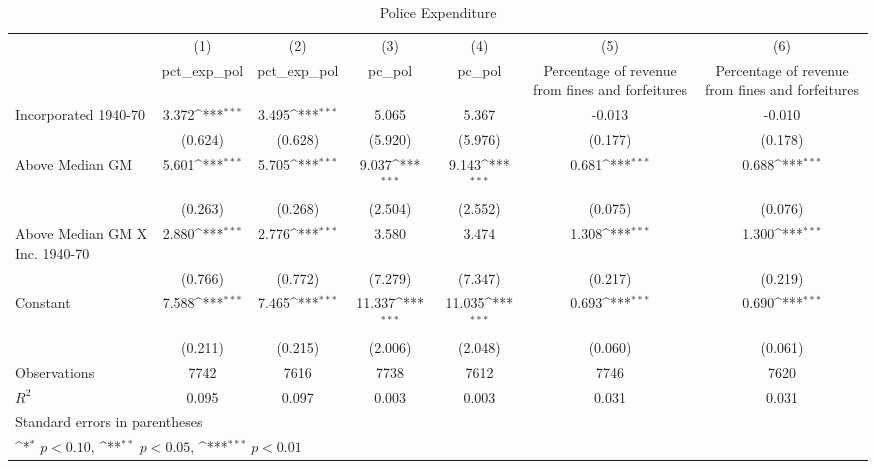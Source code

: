 \begin{table}[htbp]\centering
\def\sym#1{\ifmmode^{#1}\else\(^{#1}\)\fi}
\caption{Police Expenditure}
\begin{tabular}{l*{6}{c}}
\hline\hline
                    &\multicolumn{1}{c}{(1)}&\multicolumn{1}{c}{(2)}&\multicolumn{1}{c}{(3)}&\multicolumn{1}{c}{(4)}&\multicolumn{1}{c}{(5)}&\multicolumn{1}{c}{(6)}\\
                    &\multicolumn{1}{c}{pct\_exp\_pol}&\multicolumn{1}{c}{pct\_exp\_pol}&\multicolumn{1}{c}{pc\_pol}&\multicolumn{1}{c}{pc\_pol}&\multicolumn{1}{c}{Percentage of revenue from fines and forfeitures}&\multicolumn{1}{c}{Percentage of revenue from fines and forfeitures}\\
\hline
Incorporated 1940-70&       3.372\sym{***}&       3.495\sym{***}&       5.065         &       5.367         &      -0.013         &      -0.010         \\
                    &     (0.624)         &     (0.628)         &     (5.920)         &     (5.976)         &     (0.177)         &     (0.178)         \\
[1em]
Above Median GM     &       5.601\sym{***}&       5.705\sym{***}&       9.037\sym{***}&       9.143\sym{***}&       0.681\sym{***}&       0.688\sym{***}\\
                    &     (0.263)         &     (0.268)         &     (2.504)         &     (2.552)         &     (0.075)         &     (0.076)         \\
[1em]
Above Median GM X Inc. 1940-70&       2.880\sym{***}&       2.776\sym{***}&       3.580         &       3.474         &       1.308\sym{***}&       1.300\sym{***}\\
                    &     (0.766)         &     (0.772)         &     (7.279)         &     (7.347)         &     (0.217)         &     (0.219)         \\
[1em]
Constant            &       7.588\sym{***}&       7.465\sym{***}&      11.337\sym{***}&      11.035\sym{***}&       0.693\sym{***}&       0.690\sym{***}\\
                    &     (0.211)         &     (0.215)         &     (2.006)         &     (2.048)         &     (0.060)         &     (0.061)         \\
\hline
Observations        &        7742         &        7616         &        7738         &        7612         &        7746         &        7620         \\
\(R^{2}\)           &       0.095         &       0.097         &       0.003         &       0.003         &       0.031         &       0.031         \\
\hline\hline
\multicolumn{7}{l}{\footnotesize Standard errors in parentheses}\\
\multicolumn{7}{l}{\footnotesize \sym{*} \(p<0.10\), \sym{**} \(p<0.05\), \sym{***} \(p<0.01\)}\\
\end{tabular}
\end{table}
